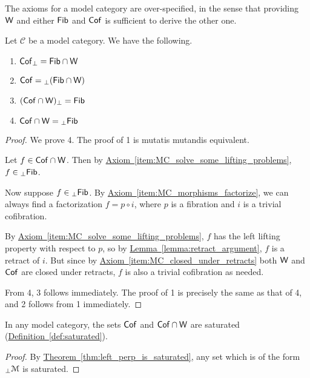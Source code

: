 \documentclass[main.tex]{subfiles}
\begin{document}
The axioms for a model category are over-specified, in the sense that providing $\mathsf{W}$ and either $\mathsf{Fib}$ and $\mathsf{Cof}$ is sufficient to derive the other one.
\begin{lemma}
  \label{lemma:relations_between_lifting_properties_and_fibrations}
  Let $\mathcal{C}$ be a model category. We have the following.
  \begin{enumerate}
    \item $\mathsf{Cof}_{\perp} = \mathsf{Fib} \cap \mathsf{W}$
    \item $\mathsf{Cof} = {}_{\perp}(\mathsf{Fib} \cap \mathsf{W})$
    \item $(\mathsf{Cof} \cap \mathsf{W})_{\perp} = \mathsf{Fib}$
    \item $\mathsf{Cof} \cap \mathsf{W} = {}_{\perp}\mathsf{Fib}$
  \end{enumerate}
\end{lemma}
\begin{proof}
  We prove 4. The proof of 1 is mutatis mutandis equivalent.

  Let $f \in \mathsf{Cof} \cap \mathsf{W}$. Then by \hyperref[item:MC_solve_some_lifting_problems]{Axiom~\ref*{item:MC_solve_some_lifting_problems}}, $f \in {}_{\perp}\mathsf{Fib}$.

  Now suppose $f \in {}_{\perp}\mathsf{Fib}$. By \hyperref[item:MC_morphisms_factorize]{Axiom~\ref*{item:MC_morphisms_factorize}}, we can always find a factorization $f = p \circ i$, where $p$ is a fibration and $i$ is a trivial cofibration.

  By \hyperref[item:MC_solve_some_lifting_problems]{Axiom~\ref*{item:MC_solve_some_lifting_problems}}, $f$ has the left lifting property with respect to $p$, so by \hyperref[lemma:retract_argument]{Lemma~\ref*{lemma:retract_argument}}, $f$ is a retract of $i$. But since by \hyperref[item:MC_closed_under_retracts]{Axiom~\ref*{item:MC_closed_under_retracts}} both $\mathsf{W}$ and $\mathsf{Cof}$ are closed under retracts, $f$ is also a trivial cofibration as needed.

  From 4, 3 follows immediately. The proof of 1 is precisely the same as that of 4, and 2 follows from 1 immediately.
\end{proof}

\begin{corollary}
  \label{cor:trivial_fibrations_and_cofibrations_are_saturated}
  In any model category, the sets $\mathsf{Cof}$ and $\mathsf{Cof} \cap \mathsf{W}$ are saturated (\hyperref[def:saturated]{Definition~\ref*{def:saturated}}).
\end{corollary}
\begin{proof}
  By \hyperref[thm:left_perp_is_saturated]{Theorem~\ref*{thm:left_perp_is_saturated}}, any set which is of the form ${}_{\perp} \mathcal{M}$ is saturated.
\end{proof}
\end{document}
